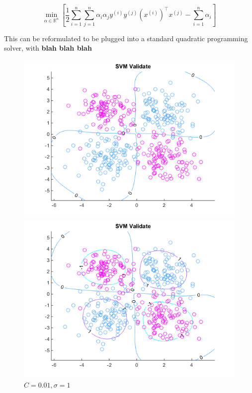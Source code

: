 \documentclass[10pt,letterpaper]{article}
\begin{document}
\begin{equation}
\min_{\alpha \in \mathbb{R}^n} \left[\dfrac{1}{2} \sum_{i=1}^n \sum_{j=1}^n \alpha_i \alpha_j y^{(i)} y^{(j)} (x^{(i)})^\intercal x^{(j)} - \sum_{i=1}^n \alpha_i \right]
\end{equation}

This can be reformulated to be plugged into a standard quadratic programming solver, with \textbf{blah blah blah}

\begin{center}
\begin{figure}[!htb]
  \includegraphics[width=\linewidth]{figures/C,01sigma1.png}
  \caption{$C = 0.01, \sigma = 1$}
\endminipage\hfill
{}
  \includegraphics[width=\linewidth]{figures/C,1sigma1.png}

\end{figure}
\end{center}
\end{document}
